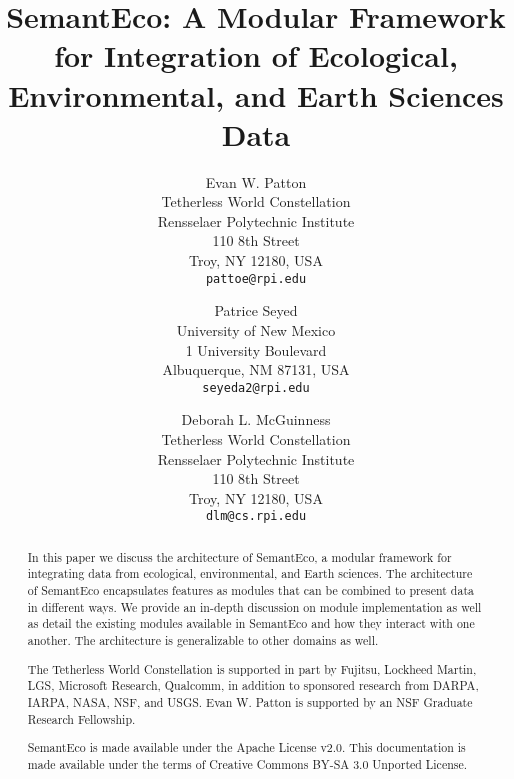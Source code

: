 \documentclass[letterpaper]{report}
\begin{document}
\title{SemantEco: A Modular Framework for Integration of Ecological, Environmental, and Earth Sciences Data}
\author{Evan W. Patton \\
Tetherless World Constellation\\
Rensselaer Polytechnic Institute\\
110 8th Street\\
Troy, NY 12180, USA\\
\texttt{pattoe@rpi.edu}
\and Patrice Seyed \\
University of New Mexico\\
1 University Boulevard\\
Albuquerque, NM 87131, USA\\
\texttt{seyeda2@rpi.edu}
\and Deborah L. McGuinness\\
Tetherless World Constellation\\
Rensselaer Polytechnic Institute\\
110 8th Street\\
Troy, NY 12180, USA\\
\texttt{dlm@cs.rpi.edu}
}
\maketitle
\begin{abstract}
In this paper we discuss the architecture of SemantEco, a modular framework for integrating data from ecological, environmental, and Earth sciences. The architecture of SemantEco encapsulates features as modules that can be combined to present data in different ways. We provide an in-depth discussion on module implementation as well as detail the existing modules available in SemantEco and how they interact with one another. The architecture is generalizable to other domains as well. %
\end{abstract}

\renewcommand{\abstractname}{Acknowledgements}
\begin{abstract}
The Tetherless World Constellation is supported in part by Fujitsu, Lockheed Martin, LGS, Microsoft Research, Qualcomm, in addition to sponsored research from DARPA, IARPA, NASA, NSF, and USGS. Evan W. Patton is supported by an NSF Graduate Research Fellowship.
\end{abstract}

\renewcommand{\abstractname}{Licensing}
\begin{abstract}
SemantEco is made available under the {\color{red} Apache License v2.0}. This documentation is made available under the terms of {\color{red} Creative Commons BY-SA 3.0 Unported License}.
\end{abstract}
\end{document}
